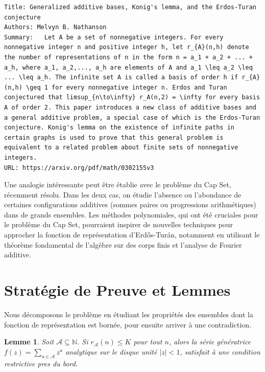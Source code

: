 \documentclass[11pt,a4paper]{article}
\newtheorem{lemma}{Lemme}
\begin{document}
\begin{verbatim}
Title: Generalized additive bases, Konig's lemma, and the Erdos-Turan conjecture
Authors: Melvyn B. Nathanson
Summary:   Let A be a set of nonnegative integers. For every nonnegative integer n and positive integer h, let r_{A}(n,h) denote the number of representations of n in the form n = a_1 + a_2 + ... + a_h, where a_1, a_2,..., a_h are elements of A and a_1 \leq a_2 \leq ... \leq a_h. The infinite set A is called a basis of order h if r_{A}(n,h) \geq 1 for every nonnegative integer n. Erdos and Turan conjectured that limsup_{n\to\infty} r_A(n,2) = \infty for every basis A of order 2. This paper introduces a new class of additive bases and a general additive problem, a special case of which is the Erdos-Turan conjecture. Konig's lemma on the existence of infinite paths in certain graphs is used to prove that this general problem is equivalent to a related problem about finite sets of nonnegative integers.
URL: https://arxiv.org/pdf/math/0302155v3
\end{verbatim}

Une analogie int\'eressante peut \^etre \'etablie avec le probl\`eme du Cap Set, r\'ecemment r\'esolu. Dans les deux cas, on \'etudie l'absence ou l'abondance de certaines configurations additives (sommes paires ou progressions arithm\'etiques) dans de grands ensembles. Les m\'ethodes polynomiales, qui ont \'et\'e cruciales pour le probl\`eme du Cap Set, pourraient inspirer de nouvelles techniques pour approcher la fonction de repr\'esentation d'Erd\H{o}s-Tur\'an, notamment en utilisant le th\'eor\`eme fondamental de l'alg\`ebre sur des corps finis et l'analyse de Fourier additive.

\section{Strat\'egie de Preuve et Lemmes}

Nous d\'ecomposons le probl\`eme en \'etudiant les propri\'et\'es des ensembles dont la fonction de repr\'esentation est born\'ee, pour ensuite arriver \`a une contradiction.

\begin{lemma}
Soit $\mathcal{A} \subseteq \mathbb{N}$. Si $r_{\mathcal{A}}(n) \le K$ pour tout $n$, alors la s\'erie g\'en\'eratrice $f(z) = \sum_{a \in \mathcal{A}} z^a$ analytique sur le disque unit\'e $|z| < 1$, satisfait \`a une condition restrictive pres du bord.
\end{lemma}
\end{document}
